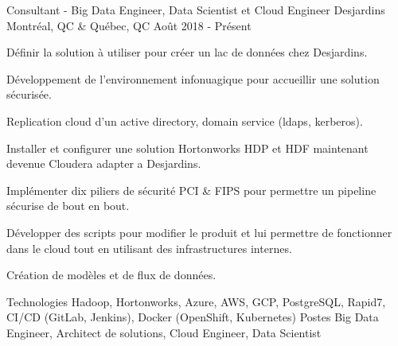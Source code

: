 

\begin{cventries}

  \cventry
    {Consultant - Big Data Engineer, Data Scientist et Cloud Engineer}
    {Desjardins}
    {Montréal, QC \& Québec, QC}
    {Août 2018 - Présent}
    {
      \begin{cvitems}
        \item {Définir la solution à utiliser pour créer un lac de données chez Desjardins.}
        \item {Développement de l'environnement infonuagique pour accueillir une solution sécurisée.}
        \item {Replication cloud d'un active directory, domain service (ldaps, kerberos).}
        \item {Installer et configurer une solution Hortonworks HDP et HDF maintenant devenue Cloudera adapter a Desjardins.}
        \item {Implémenter dix piliers de sécurité PCI \& FIPS pour permettre un pipeline sécurise de bout en bout.}
        \item {Développer des scripts pour modifier le produit et lui permettre de fonctionner dans le cloud tout en utilisant des infrastructures internes.}
        \item {Création de modèles et de flux de données.}
        \vspace{2mm}
        \begin{cvskills}
          \cvskill
          {Technologies}
    	  {Hadoop, Hortonworks, Azure, AWS, GCP, PostgreSQL, Rapid7, CI/CD (GitLab, Jenkins), Docker (OpenShift, Kubernetes)}
    	  \cvskill
          {Postes}
    	  {Big Data Engineer, Architect de solutions, Cloud Engineer, Data Scientist}
        \end{cvskills}
        \begin{cvsubentries}
        \end{cvsubentries}
      \end{cvitems}
    }


\end{cventries}
